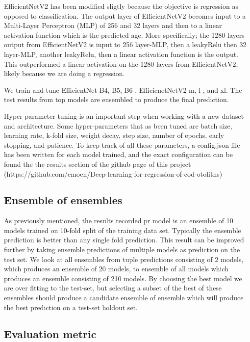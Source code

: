 \documentclass[10pt,letterpaper]{article}
\begin{document}
EfficientNetV2 has been modified sligtly because the objective is regression as opposed to classification. The output layer of EfficientNetV2 becomes input to a Multi-Layer Perceptron (MLP) of 256 and 32 layers and then to a linear activation function which is the predicted age. More specifically; the 1280 layers output from EfficientNetV2 is input to 256 layer-MLP, then a leakyRelu \citep{leakyRelu} then 32 layer-MLP, another leakyRelu, then a linear activation function is the output. This outperformed a linear activation on the 1280 layers from EfficientNetV2, likely because we are doing a regression.

We train and tune EfficientNet B4, B5, B6 \citep{2015arXiv151200567S}, EfficienetNetV2 m, l \citep{szegedy2015going}, and xl. 
The test results from top models are ensembled to produce the final prediction.

Hyper-parameter tuning is an important step when working with a new dataset and architecture. Some hyper-parameters
that as been tuned are batch size, learning rate, k-fold size, weight decay, step size, number of epochs, early stopping, and
patience. To keep track of all these parameters, a config.json file has been written for each model trained, and 
the exact configuration can be found the the results section of the github page of this project
(https://github.com/emoen/Deep-learning-for-regression-of-cod-otoliths)


\subsection*{Ensemble of ensembles}

As previously mentioned, the results recorded pr model is an ensemble of 10 models trained on 10-fold split of the
training data set. Typically the ensemble prediction is better than any single fold prediction. 
This result can be improved further by taking ensemble predictions of multiple models as prediction on the test set.
We look at all ensembles from tuple predictions consisting of 2 models, which produces an ensemble of 20 models,
to ensemble of all models which produces an ensemble consisting of 210 models. 
By choosing the best model we are over fitting to the test-set, but 
selecting a subset of the best of these ensembles should produce a candidate ensemble
of ensemble which will produce the best prediction on a test-set holdout set.

\subsection*{Evaluation metric}
\end{document}
